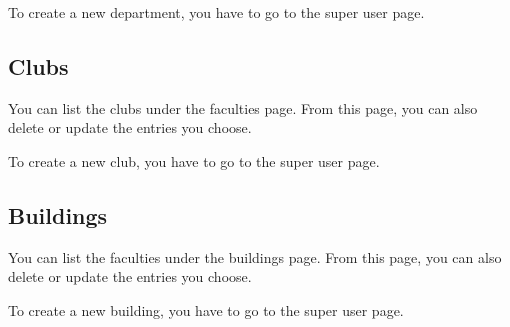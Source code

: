 \documentclass[letterpaper,10pt,english]{sphinxmanual}
\begin{document}
To create a new department, you have to go to the super user page.

\begin{figure}[htbp]
\centering

\noindent{}
\end{figure}

\begin{figure}[htbp]
\centering

\noindent{}
\end{figure}

\begin{figure}[htbp]
\centering

\noindent{}
\end{figure}


\subsection{Clubs}
\label{\detokenize{user/kaplan:clubs}}
You can list the clubs under the faculties page. From this page, you can also delete or update
the entries you choose.

To create a new club, you have to go to the super user page.

\begin{figure}[htbp]
\centering

\noindent{}
\end{figure}

\begin{figure}[htbp]
\centering

\noindent{}
\end{figure}

\begin{figure}[htbp]
\centering

\noindent{}
\end{figure}


\subsection{Buildings}
\label{\detokenize{user/kaplan:buildings}}
You can list the faculties under the buildings page. From this page, you can also delete or update
the entries you choose.

To create a new building, you have to go to the super user page.
\end{document}
